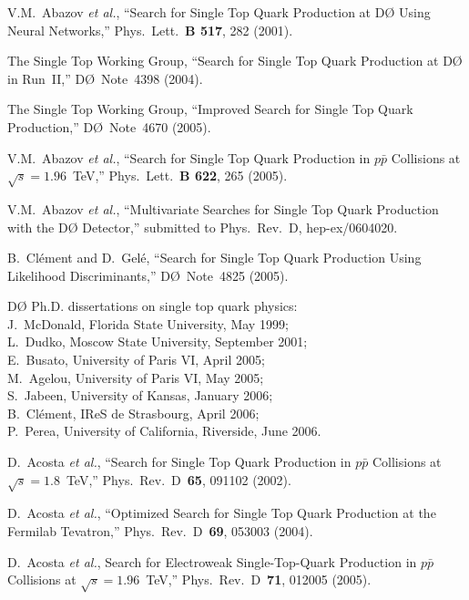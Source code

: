 \documentclass[aps]{revtex4}
\newcommand{\dzero}     {D\O}
\newcommand{\ppbar}     {\mbox{$p\bar{p}$}}
\begin{document}
\begin{thebibliography}{99.}
V.M.~Abazov {\it et al.},
``Search for Single Top Quark Production at {\dzero} Using Neural
Networks,''
Phys.\ Lett.\ {\bf B 517}, 282 (2001).

The Single Top Working Group,
``Search for Single Top Quark Production at {\dzero} in Run~II,''
{\dzero}~Note~4398 (2004).

The Single Top Working Group,
``Improved Search for Single Top Quark Production,''
{\dzero}~Note~4670 (2005).

V.M.~Abazov {\it et al.},
``Search for Single Top Quark Production in {\ppbar} Collisions at
$\sqrt{s} = 1.96$~TeV,''
Phys.\ Lett.\ {\bf B 622}, 265 (2005).

V.M.~Abazov {\it et al.},
``Multivariate Searches for Single Top Quark Production with the
{\dzero} Detector,''
submitted to Phys.\ Rev.\ D, hep-ex/0604020.

B.~Cl\'{e}ment and D.~Gel\'{e},
``Search for Single Top Quark Production Using Likelihood
Discriminants,''
{\dzero}~Note~4825 (2005).

{\dzero} Ph.D. dissertations on single top quark physics:\\
J.~McDonald, Florida State University, May 1999;\\
L.~Dudko, Moscow State University, September 2001;\\
E.~Busato, University of Paris VI, April 2005;\\
M.~Agelou, University of Paris VI, May 2005;\\
S.~Jabeen, University of Kansas, January 2006;\\
B.~Cl\'{e}ment, IReS de Strasbourg, April 2006;\\
P.~Perea, University of California, Riverside, June 2006.

D.~Acosta {\it et al.},
``Search for Single Top Quark Production in {\ppbar} Collisions at
$\sqrt{s} = 1.8$~TeV,''
Phys.\ Rev.\ D~{\bf 65}, 091102 (2002).

D.~Acosta {\it et al.},
``Optimized Search for Single Top Quark Production at the Fermilab
Tevatron,''
Phys.\ Rev.\ D~{\bf 69}, 053003 (2004).

D.~Acosta {\it et al.},
Search for Electroweak Single-Top-Quark Production in {\ppbar}
Collisions at $\sqrt{s} = 1.96$~TeV,''
Phys.\ Rev.\ D~{\bf 71}, 012005 (2005).


\end{thebibliography}
\end{document}
